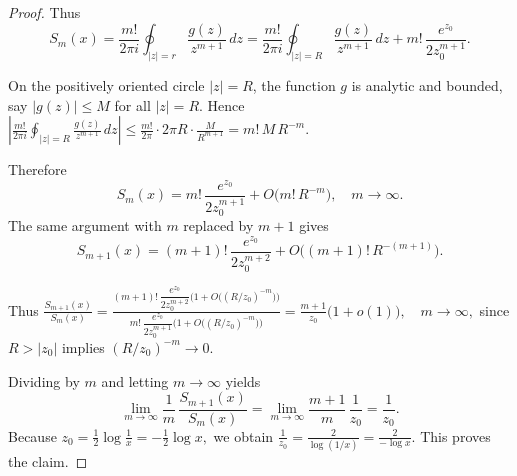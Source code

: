 \documentclass[10pt,a4paper]{amsart}
\begin{document}
\begin{proof}
Thus
\[
S_m(x)
= \frac{m!}{2\pi i} \oint_{|z|=r}\frac{g(z)}{z^{m+1}}\,dz
= \frac{m!}{2\pi i} \oint_{|z|=R}\frac{g(z)}{z^{m+1}}\,dz
  + m!\,\frac{e^{z_0}}{2 z_0^{m+1}}.
\]

On the positively oriented circle $|z|=R$, the function $g$ is analytic and bounded, say $|g(z)|\le M$ for all $|z|=R$. Hence
\(\displaystyle
\left|\frac{m!}{2\pi i} \oint_{|z|=R}\frac{g(z)}{z^{m+1}}\,dz\right|
\le \frac{m!}{2\pi} \cdot 2\pi R \cdot \frac{M}{R^{m+1}}
= m!\,M\,R^{-m}.
\)

Therefore
\[
S_m(x)
= m!\,\frac{e^{z_0}}{2 z_0^{m+1}}
  + O\bigl(m!\,R^{-m}\bigr),
\quad m\to\infty.
\]
The same argument with $m$ replaced by $m+1$ gives
\[
S_{m+1}(x)
= (m+1)!\,\frac{e^{z_0}}{2 z_0^{m+2}}
  + O\bigl((m+1)!\,R^{-(m+1)}\bigr).
\]

Thus
\(\displaystyle
\frac{S_{m+1}(x)}{S_m(x)}
= \frac{(m+1)!\,\dfrac{e^{z_0}}{2 z_0^{m+2}}
          \bigl(1 + O\bigl((R/z_0)^{-m}\bigr)\bigr)}
       {m!\,\dfrac{e^{z_0}}{2 z_0^{m+1}}
          \bigl(1 + O\bigl((R/z_0)^{-m}\bigr)\bigr)}
= \frac{m+1}{z_0}\bigl(1 + o(1)\bigr),
\quad m\to\infty,
\)
since $R>|z_0|$ implies $(R/z_0)^{-m}\to 0$.

Dividing by $m$ and letting $m\to\infty$ yields
\[
\lim_{m\to\infty} \frac{1}{m}\,\frac{S_{m+1}(x)}{S_m(x)}
= \lim_{m\to\infty} \frac{m+1}{m}\,\frac{1}{z_0}
= \frac{1}{z_0}.
\]
Because
\(\displaystyle
z_0 = \frac{1}{2}\log\frac{1}{x} = -\frac{1}{2}\log x,
\)
we obtain
\(\displaystyle
\frac{1}{z_0}
= \frac{2}{\log(1/x)}
= \frac{2}{-\log x}.
\)
This proves the claim.
\end{proof}
\end{document}
